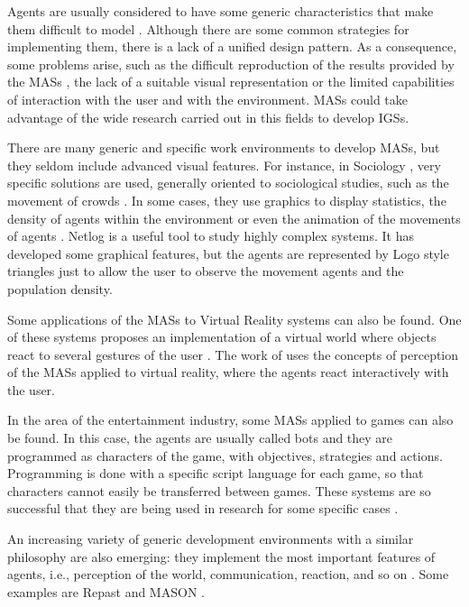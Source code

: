 \documentclass[runningheads]{llncs}
\begin{document}
Agents are usually considered to have some generic characteristics that make them difficult to
model \cite{Gilbert2008}. Although there are some common strategies for implementing them, there is
a lack of a unified design pattern. As a consequence, some problems arise, such as the difficult
reproduction of the results provided by the MASs \cite{Axelrod1997}, the lack of a suitable visual
representation or the limited capabilities of interaction with the user and with the environment.
MASs could take advantage of the wide research carried out in this fields to develop IGSs.

There are many generic and specific work environments to develop MASs, but they seldom include
advanced visual features. For instance, in Sociology
\cite{Axelrod1997,Gilbert2008}, very specific solutions are used, generally
oriented to sociological studies, such as the movement of crowds
\cite{Ulicny2001,Reynolds2000}. In some cases, they use graphics to display statistics,
the density of agents within the environment or even the animation of the movements of agents
\cite{Reynolds2000}. Netlog \cite{Wilensky1999} is a useful tool to study highly complex systems.
It has developed some graphical features, but the agents are represented by Logo style triangles
just to allow the user to observe the movement agents and the population density.

Some applications of the MASs to Virtual Reality systems can also be found. One of these systems
proposes an implementation of a virtual world where objects react to several gestures of the user
\cite{Maes1995}. The work of \cite{Wachsmuth1995} uses the concepts of perception of the MASs
applied to virtual reality, where the agents react interactively with the user.

In the area of the entertainment industry, some MASs applied to games can also be found. In this
case, the agents are usually called bots \cite{Khoo2002} and they are programmed as characters of
the game, with objectives, strategies and actions. Programming is done with a specific script
language for each game, so that characters cannot easily be transferred between games. These
systems are so successful that they are being used in research for some specific cases
\cite{Rhyne2000}.

An increasing variety of generic development environments with a similar philosophy are also
emerging: they implement the most important features of agents, i.e., perception of the world,
communication, reaction, and so on \cite{Gilbert2008}. Some examples are Repast \cite{North2005}
and MASON \cite{Luke2005}.
\end{document}
